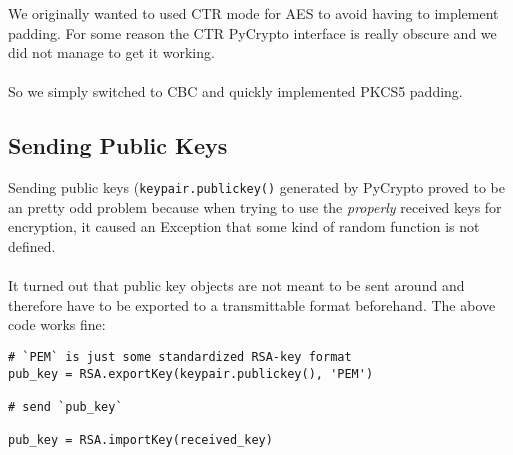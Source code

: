 \documentclass[11pt, a4paper]{article}
\begin{document}
We originally wanted to used CTR mode for AES to avoid having to implement
padding. For some reason the CTR PyCrypto interface is really obscure and we
did not manage to get it working.
\\\\
So we simply switched to CBC and quickly implemented PKCS5 padding.

\subsection{Sending Public Keys}

Sending public keys (\lstinline{keypair.publickey()} generated by PyCrypto
proved to be an pretty odd problem because when trying to use the
\textit{properly} received keys for encryption, it caused an Exception that
some kind of random function is not defined.
\\\\
It turned out that public key objects are not meant to be sent around and
therefore have to be exported to a transmittable format beforehand. The above
code works fine:

\begin{lstlisting}
# `PEM` is just some standardized RSA-key format
pub_key = RSA.exportKey(keypair.publickey(), 'PEM')

# send `pub_key`

pub_key = RSA.importKey(received_key)
\end{lstlisting}

\nocite{*}


\end{document}
